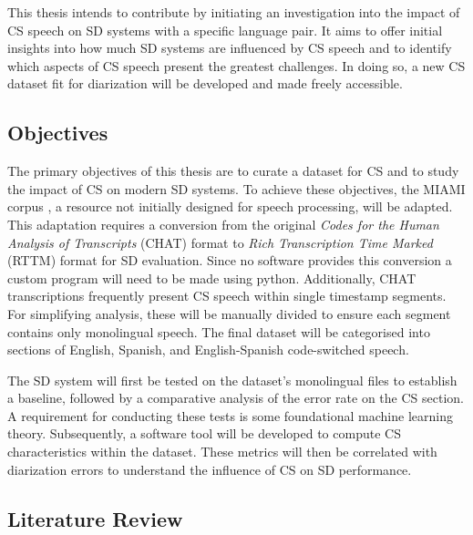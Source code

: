 \documentclass[11pt, a4paper]{report}
\begin{document}
\vspace*{10pt}
This thesis intends to contribute by initiating 
an investigation into the impact of CS speech on SD systems with a specific 
language pair. It aims to offer initial insights into how much SD systems are 
influenced by CS speech and to identify which aspects of CS speech present the 
greatest challenges. In doing so, a new CS dataset fit for diarization will be 
developed and made freely accessible.

\vspace*{10pt}

\subsection*{Objectives}

The primary objectives of this thesis are to curate a dataset for CS and to study the 
impact of CS on modern SD systems. To achieve these objectives, the MIAMI corpus 
\cite{deucharMiamiCorpusDocumentation}, a resource not initially designed for speech 
processing, will be adapted. This adaptation requires a conversion from the original \textit{Codes for the 
Human Analysis of Transcripts} (CHAT) format to \textit{Rich Transcription Time Marked} (RTTM) format for 
SD evaluation. Since no software provides this conversion a custom program will need to be made 
using python. Additionally, CHAT transcriptions frequently present CS speech within 
single timestamp segments. For simplifying analysis, these will be manually divided
to ensure each segment contains only monolingual speech. The final dataset will be 
categorised into sections of English, Spanish, and English-Spanish code-switched speech.

\vspace*{10pt}
The SD system will first be tested on the dataset's monolingual files to establish a
baseline, followed by a comparative analysis of the error rate on the CS section.
A requirement for conducting these tests is some foundational machine learning theory.
Subsequently, a software tool will be developed to compute CS characteristics within the 
dataset. These metrics will then be correlated with diarization errors to understand the 
influence of CS on SD performance.


\subsection*{Literature Review}
\end{document}
